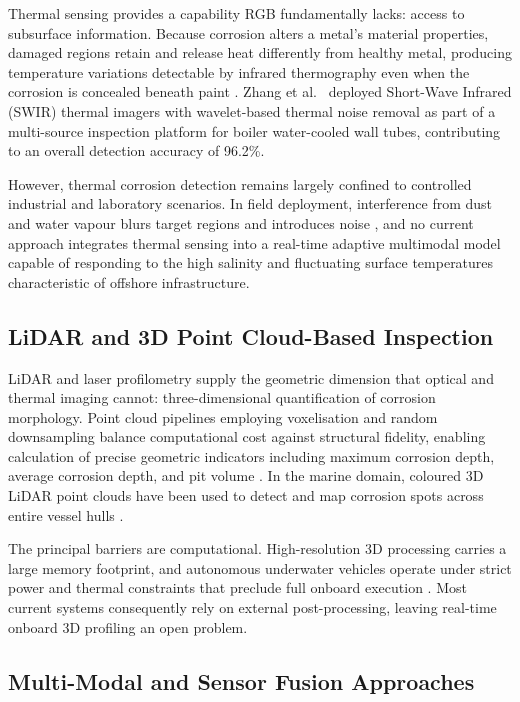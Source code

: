 Thermal sensing provides a capability RGB fundamentally lacks: access to subsurface information. Because corrosion alters a metal's material properties, damaged regions retain and release heat differently from healthy metal, producing temperature variations detectable by infrared thermography even when the corrosion is concealed beneath paint \cite{zhang2026application}. Zhang et al.\ \cite{zhang2026application} deployed Short-Wave Infrared (SWIR) thermal imagers with wavelet-based thermal noise removal as part of a multi-source inspection platform for boiler water-cooled wall tubes, contributing to an overall detection accuracy of 96.2\%.

However, thermal corrosion detection remains largely confined to controlled industrial and laboratory scenarios. In field deployment, interference from dust and water vapour blurs target regions and introduces noise \cite{zhang2026application}, and no current approach integrates thermal sensing into a real-time adaptive multimodal model capable of responding to the high salinity and fluctuating surface temperatures characteristic of offshore infrastructure.

\subsection{LiDAR and 3D Point Cloud-Based Inspection}

LiDAR and laser profilometry supply the geometric dimension that optical and thermal imaging cannot: three-dimensional quantification of corrosion morphology. Point cloud pipelines employing voxelisation and random downsampling balance computational cost against structural fidelity, enabling calculation of precise geometric indicators including maximum corrosion depth, average corrosion depth, and pit volume \cite{zhang2026application, olawole2026advanced}. In the marine domain, coloured 3D LiDAR point clouds have been used to detect and map corrosion spots across entire vessel hulls \cite{yu2022surface}.

The principal barriers are computational. High-resolution 3D processing carries a large memory footprint, and autonomous underwater vehicles operate under strict power and thermal constraints that preclude full onboard execution \cite{olawole2026advanced}. Most current systems consequently rely on external post-processing, leaving real-time onboard 3D profiling an open problem.

\subsection{Multi-Modal and Sensor Fusion Approaches}

